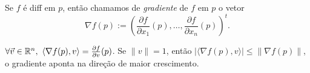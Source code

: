 \Ef

\begin{definition}
    Se \(f\) é diff em \(p\), então chamamos de \emph{gradiente} de \(f\) em \(p\) o vetor 
    \[\nabla f(p) := \left(\frac{\partial f}{\partial x_1}(p),\ldots,\frac{\partial f}{\partial x_n}(p)\right)^t. \]
\end{definition}

\begin{note}
    \(\forall \vec{v}\in \mathbb{R}^n,\ \langle \nabla f(p) , v\rangle = \frac{\partial f}{\partial v}(p)\). Se \(\|v\|=1\), então \( |\langle \nabla f (p), v\rangle| \leq \|\nabla f(p)\|\), o gradiente aponta na direção de maior crescimento.  
\end{note}
